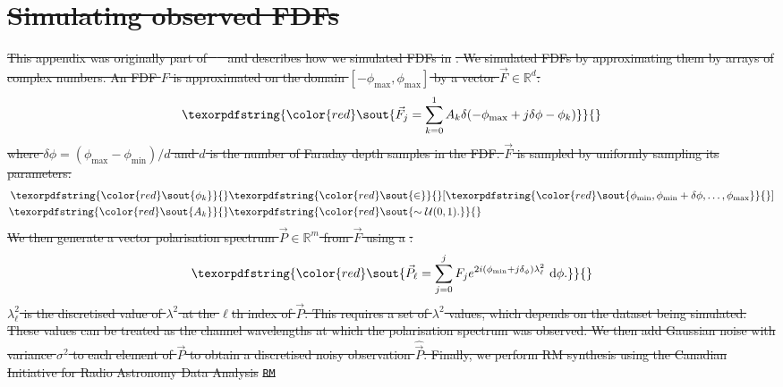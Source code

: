 \documentclass[11pt, a4paper]{book}
\providecommand{\DIFdeltex}[1]{{\protect\color{red}\sout{#1}}}                      %
\providecommand{\DIFdel}[1]{\texorpdfstring{\DIFdeltex{#1}}{}} %
\begin{document}
\section{\DIFdel{Simulating observed FDFs}}
\addtocounter{section}{-1}%

\DIFdel{This appendix was originally part of \mbox{%
\citet{alger2021interpretable} }\hspace{0pt}%
and describes how we simulated FDFs in }%
\DIFdel{. We simulated FDFs by approximating them by arrays of complex numbers. An FDF $F$ is approximated on the domain $[-\phi_{\max}, \phi_{\max}]$ by a vector $\vec F \in \mathbb R^d$:
    }\begin{displaymath}
      \DIFdel{%
      \vec F_j = \sum_{k = 0}^1 A_k \delta(-\phi_{\max} + j \delta \phi - \phi_k)
    }\end{displaymath}%
\DIFdel{where $\delta\phi = (\phi_{\max} - \phi_{\min}) / d$ and $d$ is the number of Faraday depth samples in the FDF.
    $\vec F$ is sampled by uniformly sampling its parameters:
    }\begin{align*}
      \DIFdel{%
      \phi_k }&\DIFdel{\in }[\DIFdel{\phi_{\min}, \phi_{\min} + \delta\phi, \dots, \phi_{\max}}]\\
      \DIFdel{A_k }&\DIFdel{\sim \mathcal U(0, 1).
    }\end{align*}%
\DIFdel{We then generate a vector polarisation spectrum $\vec P \in \mathbb R^m$ from $\vec F$ using a }%
\DIFdel{:
    }\begin{displaymath}
      \DIFdel{%
      \vec P_\ell = \sum_{j = 0}^{j} F_j e^{2i(\phi_{\min} + j\delta_\phi)\lambda^2_\ell}\ \mathrm{d}\phi.
    }\end{displaymath}%
\DIFdel{$\lambda^2_\ell$ is the discretised value of $\lambda^2$ at the $\ell$th index of $\vec P$. This requires a set of $\lambda^2$ values, which depends on the dataset being simulated. These values can be treated as the channel wavelengths at which the polarisation spectrum was observed. We then add Gaussian noise with variance $\sigma^2$ to each element of $\vec P$ to obtain a discretised noisy observation $\hat{\vec{P}}$. Finally, we perform RM synthesis using the Canadian Initiative for Radio Astronomy Data Analysis }\texttt{\DIFdel{RM}} %
\end{document}
